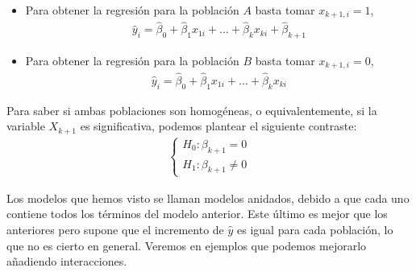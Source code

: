 \begin{enumerate}
\begin{align*}
          \end{align*}
          \begin{itemize}
              \item Para obtener la regresión para la población $A$ basta tomar $x_{k+1,i} = 1$,
                    \begin{align*}
                        \widehat{y}_i = \widehat{\beta}_0 + \widehat{\beta}_1 x_{1i} + \ldots + \widehat{\beta}_k x_{ki} + \widehat{\beta}_{k+1}
                    \end{align*}
              \item Para obtener la regresión para la población $B$ basta tomar $x_{k+1,i} = 0$,
                    \begin{align*}
                        \widehat{y}_i = \widehat{\beta}_0 + \widehat{\beta}_1 x_{1i} + \ldots + \widehat{\beta}_k x_{ki}
                    \end{align*}
          \end{itemize}
          Para saber si ambas poblaciones son homogéneas, o equivalentemente, si la variable $X_{k+1}$ es significativa, podemos plantear el siguiente contraste:
          \begin{align*}
              \begin{cases}
                  H_0 : \beta_{k+1} = 0 \\
                  H_1 : \beta_{k+1} \not = 0
              \end{cases}
          \end{align*}
\end{enumerate}
Los modelos que hemos visto se llaman modelos anidados, debido a que cada uno contiene todos los términos del modelo anterior. Este último es mejor que los anteriores pero supone que el incremento de $\widehat{y}$ es igual para cada población, lo que no es cierto en general. Veremos en ejemplos que podemos mejorarlo añadiendo interacciones.


